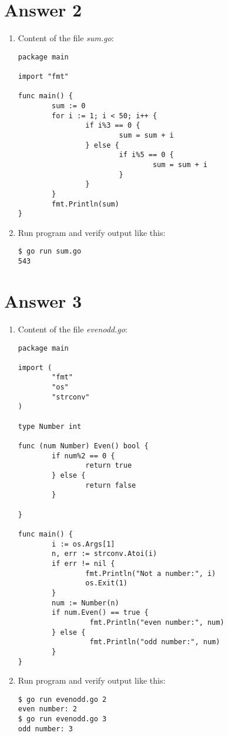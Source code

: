 \documentclass[11pt,a4paper]{article}
\begin{document}
\section*{Answer 2}
\begin{enumerate}
\item Content of the file {\it sum.go}:
\begin{verbatim}
package main

import "fmt"

func main() {
        sum := 0
        for i := 1; i < 50; i++ {
                if i%3 == 0 {
                        sum = sum + i
                } else {
                        if i%5 == 0 {
                                sum = sum + i
                        }
                }
        }
        fmt.Println(sum)
}
\end{verbatim}

\item Run program and verify output like this:
\begin{verbatim}
$ go run sum.go
543
\end{verbatim}

\end{enumerate}

\section*{Answer 3}
\begin{enumerate}
\item Content of the file {\it evenodd.go}:
\begin{verbatim}
package main

import (
        "fmt"
        "os"
        "strconv"
)

type Number int

func (num Number) Even() bool {
        if num%2 == 0 {
                return true
        } else {
                return false
        }

}

func main() {
        i := os.Args[1]
        n, err := strconv.Atoi(i)
        if err != nil {
                fmt.Println("Not a number:", i)
                os.Exit(1)
        }
        num := Number(n)
        if num.Even() == true {
                 fmt.Println("even number:", num)
        } else {
                 fmt.Println("odd number:", num)
        }
}
\end{verbatim}

\item Run program and verify output like this:
\begin{verbatim}
$ go run evenodd.go 2
even number: 2
$ go run evenodd.go 3
odd number: 3
\end{verbatim}

\end{enumerate}
\end{document}
